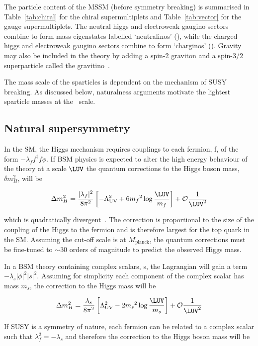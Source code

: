 The particle content of the MSSM (before symmetry breaking) 
is summarised in Table~\ref{tab:chiral} for the chiral supermultiplets
and Table~\ref{tab:vector} for the gauge supermultiplets. The neutral higgs and electroweak 
gaugino sectors combine to form mass eigenstates labelled `neutralinos' 
(\chiz), while the charged higgs and electroweak gaugino sectors combine
to form `charginos' (\chip). Gravity may also be included in the theory
by adding a spin-2 graviton and a spin-3/2 superparticle
called the gravitino~\cite{SUSYP}. 

The mass scale of the sparticles is dependent on the mechanism of SUSY breaking.
As discussed below, naturalness arguments motivate the lightest sparticle masses 
at the \TeV~scale.

\subsection{Natural supersymmetry}
\label{sec:natSUSY}
In the SM, the Higgs mechanism requires couplings to each fermion, f, of the form $-\lambda_{f}f^{\dagger}f\phi$. If BSM physics
is expected to alter the high energy behaviour of the theory at a scale $\LUV$ the quantum corrections 
to the Higgs boson mass, $\delta m^2_{H}$, will be 

\begin{equation}
\Delta m^2_H =  \frac{|\lambda_f|^2}{8\pi^2}\left[-\Lambda^2_{\text{UV}} + 6 {m_f}^2\log\frac{\LUV}{m_f}\right] + \mathcal{O}\frac{1}{\LUV^2}
\end{equation}

which is quadratically divergent~\cite{HMSSM}. The correction is proportional to the size of the coupling of the Higgs to the fermion 
and is therefore largest for the top quark in the SM. Assuming the cut-off scale is at $M_{\text{planck}}$, the quantum 
corrections must be fine-tuned to $\sim 30$ orders of magnitude to predict the observed Higgs mass. 

In a BSM theory containing complex scalars, s, the Lagrangian will gain a term $-\lambda_{s}|\phi|^2|s|^2$.
Assuming for simplicity each component of the complex scalar has mass $m_s$, the correction to the Higgs mass will be

\begin{equation}
\Delta m^2_H =  \frac{\lambda_s}{8\pi^2}\left[\Lambda^2_{\text{UV}} - 2 {m_s}^2\log\frac{\LUV}{m_s}\right] + \mathcal{O}\frac{1}{\LUV^2}
\end{equation}

If SUSY is a symmetry of nature, each fermion can be related to a complex scalar such that $\lambda_f^2 = -\lambda_s$ 
and therefore the correction to the Higgs boson mass will be 

